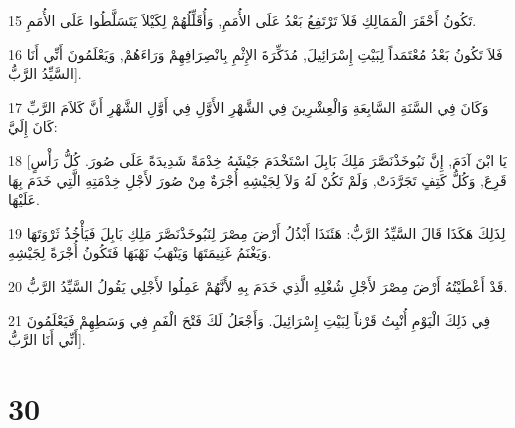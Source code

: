 \par 15 تَكُونُ أَحْقَرَ الْمَمَالِكِ فَلاَ تَرْتَفِعُ بَعْدُ عَلَى الأُمَمِ, وَأُقَلِّلُهُمْ لِكَيْلاَ يَتَسَلَّطُوا عَلَى الأُمَمِ.
\par 16 فَلاَ تَكُونُ بَعْدُ مُعْتَمَداً لِبَيْتِ إِسْرَائِيلَ, مُذَكِّرَةَ الإِثْمِ بِانْصِرَافِهِمْ وَرَاءَهُمْ, وَيَعْلَمُونَ أَنِّي أَنَا السَّيِّدُ الرَّبُّ].
\par 17 وَكَانَ فِي السَّنَةِ السَّابِعَةِ وَالْعِشْرِينَ فِي الشَّهْرِ الأَوَّلِ فِي أَوَّلِ الشَّهْرِ أَنَّ كَلاَمَ الرَّبِّ كَانَ إِلَيَّ:
\par 18 [يَا ابْنَ آدَمَ, إِنَّ نَبُوخَذْنَصَّرَ مَلِكَ بَابِلَ اسْتَخْدَمَ جَيْشَهُ خِدْمَةً شَدِيدَةً عَلَى صُورَ. كُلُّ رَأْسٍ قَرِعَ, وَكُلُّ كَتِفٍ تَجَرَّدَتْ, وَلَمْ تَكُنْ لَهُ وَلاَ لِجَيْشِهِ أُجْرَةٌ مِنْ صُورَ لأَجْلِ خِدْمَتِهِ الَّتِي خَدَمَ بِهَا عَلَيْهَا.
\par 19 لِذَلِكَ هَكَذَا قَالَ السَّيِّدُ الرَّبُّ: هَئَنَذَا أَبْذُلُ أَرْضَ مِصْرَ لِنَبُوخَذْنَصَّرَ مَلِكِ بَابِلَ فَيَأْخُذُ ثَرْوَتَهَا وَيَغْنَمُ غَنِيمَتَهَا وَيَنْهَبُ نَهْبَهَا فَتَكُونُ أُجْرَةً لِجَيْشِهِ.
\par 20 قَدْ أَعْطَيْتُهُ أَرْضَ مِصْرَ لأَجْلِ شُغْلِهِ الَّذِي خَدَمَ بِهِ لأَنَّهُمْ عَمِلُوا لأَجْلِي يَقُولُ السَّيِّدُ الرَّبُّ.
\par 21 فِي ذَلِكَ الْيَوْمِ أُنْبِتُ قَرْناً لِبَيْتِ إِسْرَائِيلَ. وَأَجْعَلُ لَكَ فَتْحَ الْفَمِ فِي وَسَطِهِمْ فَيَعْلَمُونَ أَنِّي أَنَا الرَّبُّ].

\chapter{30}


